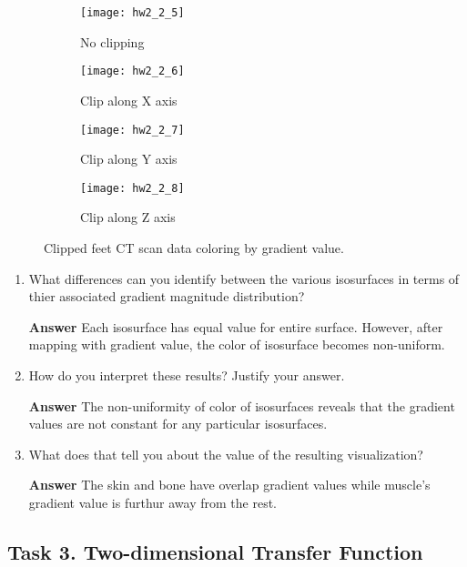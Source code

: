 \documentclass[11pt]{article}
\begin{document}
\begin{figure}[H]
\begin{subfigure}{.5\textwidth}
  \centering
  \texttt{[image: hw2\_2\_5]}
  \caption{No clipping}
  \label{fig:hw2_2_5}
\end{subfigure}
\begin{subfigure}{.5\textwidth}
  \centering
  \texttt{[image: hw2\_2\_6]}
  \caption{Clip along X axis}
  \label{fig:hw2_2_6}
\end{subfigure}

\begin{subfigure}{.5\textwidth}
  \centering
  \texttt{[image: hw2\_2\_7]}
  \caption{Clip along Y axis}
  \label{fig:hw2_2_7}
\end{subfigure}
\begin{subfigure}{.5\textwidth}
  \centering
  \texttt{[image: hw2\_2\_8]}
  \caption{Clip along Z axis}
  \label{fig:hw2_2_8}
\end{subfigure}
\caption{Clipped feet CT scan data coloring by gradient value.}
\label{fig:hw2_2_5-8}
\end{figure}

\begin{enumerate}[label=\arabic*.]

\item What differences can you identify between the various isosurfaces in terms of thier associated gradient magnitude distribution?

\noindent\textbf{Answer} Each isosurface has equal value for entire surface. However, after mapping with gradient value, the color of isosurface becomes non-uniform.

\item How do you interpret these results? Justify your answer.

\noindent\textbf{Answer} The non-uniformity of color of isosurfaces reveals that the gradient values are not constant for any particular isosurfaces.

\item What does that tell you about the value of the resulting visualization?

\noindent\textbf{Answer} The skin and bone have overlap gradient values while muscle's gradient value is furthur away from the rest.

\end{enumerate}


\subsection*{Task 3. Two-dimensional Transfer Function}
\end{document}

